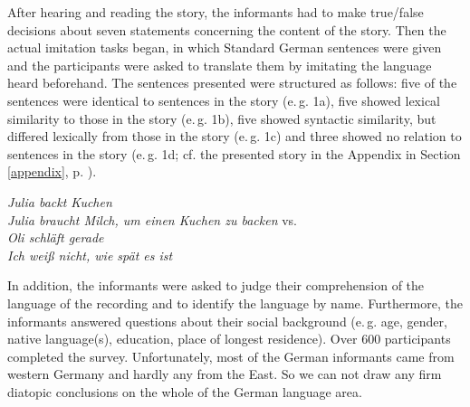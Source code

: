 \documentclass[output=paper]{LSP/langsci}
\begin{document}
After hearing and reading the story, the informants had to make true/false decisions about seven statements concerning the content of the story. Then the actual imitation tasks began, in which Standard German sentences were given and the participants were asked to translate them by imitating the language heard beforehand. The sentences presented were structured as follows: five of the sentences were identical to sentences in the story (e.\,g. 1a), five showed lexical similarity to those in the story (e.\,g. 1b), five showed syntactic similarity, but differed lexically from those in the story  (e.\,g. 1c) and three showed no relation to sentences in the story (e.\,g. 1d; cf. the presented story in the Appendix in Section  \ref{appendix}, p. \pageref{appendix}).

\eal
\ex \textit{Julia backt Kuchen}
  \label{bsp1}\\
\ex \textit{Julia braucht Milch, um einen Kuchen zu backen} vs. \textit{}
  \label{bsp2}\\
\ex \textit{Oli schl\"aft gerade}
  \label{bsp3}\\
\ex \textit{Ich weiß nicht, wie sp\"at es ist}  \label{bsp4}\\
\zl

In addition, the informants were asked to judge their comprehension of the language of the recording and to identify the language by name. Furthermore,  the informants answered questions about their social background (e.\,g. age, gender, native language(s), education, place of longest residence). Over 600 participants completed the survey. Unfortunately, most of the German informants came from western Germany and hardly any from the East. So we can not draw any firm diatopic conclusions on the whole of the German language area.
\end{document}
